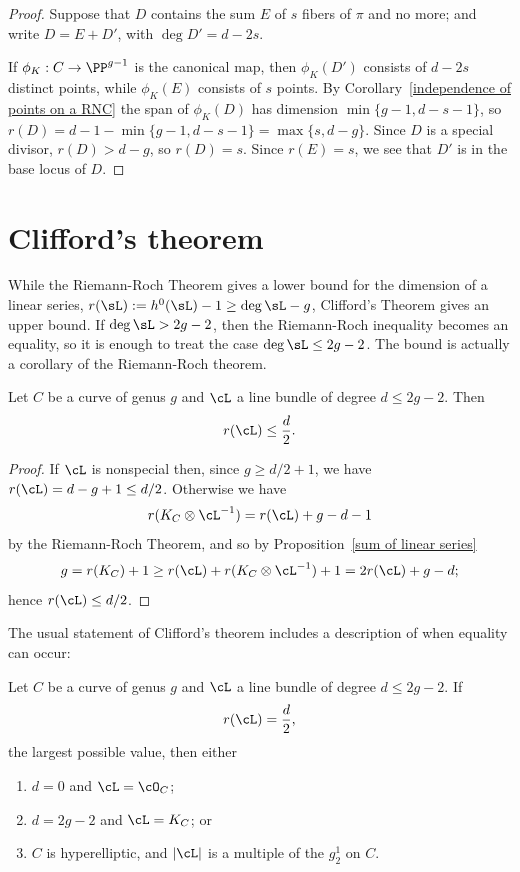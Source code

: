 \begin{proof}
Suppose that $D$ contains the sum $E$ of $s$ fibers of $\pi$ and no more; and write $D = E+D'$, with $\deg D' = d-2s$.
 
If $\phi_K:C \to \PP^{g-1}$ is the canonical map, then $\phi_K(D')$ consists of $d-2s$ distinct points, while $\phi_K(E)$ consists of
$s$ points. By Corollary~\ref{independence of points on a RNC} the span of $\phi_K(D)$ has dimension $\min\{g-1, d-s-1\}$, so 
$r(D) = d-1-\min\{g-1, d-s-1\} = \max \{s,d-g\}$. Since $D$ is a special divisor, $r(D) > d-g$, so $r(D) = s$. 
Since $r(E) =s$, we see that $D'$ is in the base locus of $D$.
\end{proof}

\section{Clifford's theorem}

While the Riemann-Roch Theorem gives a lower bound for the dimension of a linear series, $r(\sL) := h^0(\sL)-1 \geq \deg \sL -g$, Clifford's Theorem
gives an upper bound. If $\deg \sL>2g-2$, then the Riemann-Roch inequality becomes an equality, so it is enough to treat the case $\deg \sL \leq 2g-2$. The bound is actually a corollary of the Riemann-Roch theorem.

\begin{corollary}\label{Clifford bound}
 Let $C$ be a curve of genus $g$ and $\cL$ a line bundle of degree $d \leq 2g-2$. Then
$$
r(\cL) \leq \frac{d}{2}.
$$
\end{corollary}

\begin{proof}
If $\cL$ is nonspecial then, since $g\geq d/2 + 1$, we have $r(\cL) = d-g+1\leq d/2$.
Otherwise we have
$$
r(K_C\otimes \cL^{-1}) = r(\cL) +g - d - 1
$$
by the Riemann-Roch Theorem,
and so by Proposition~\ref{sum of linear series}
$$
g = r(K_C)+1  \geq r(\cL) + r(K_C\otimes \cL^{-1}) +1  = 2r(\cL) +g - d;
$$
hence $r(\cL) \leq d/2$.
\end{proof}

The usual statement of Clifford's theorem includes a description of when equality can occur:

\begin{theorem}\label{Clifford}\label{Clifford equality}
Let $C$ be a curve of genus $g$ and $\cL$ a line bundle of degree $d \leq 2g-2$. If
$$
r(\cL) = \frac{d}{2},
$$
the largest possible value, then either
\begin{enumerate}
\item $d=0$ and $\cL = \cO_C$;
\item $d = 2g-2$ and $\cL = K_C$; or
\item $C$ is hyperelliptic, and $|\cL|$ is a multiple of the $g^1_2$ on $C$.
\end{enumerate}
\end{theorem}

